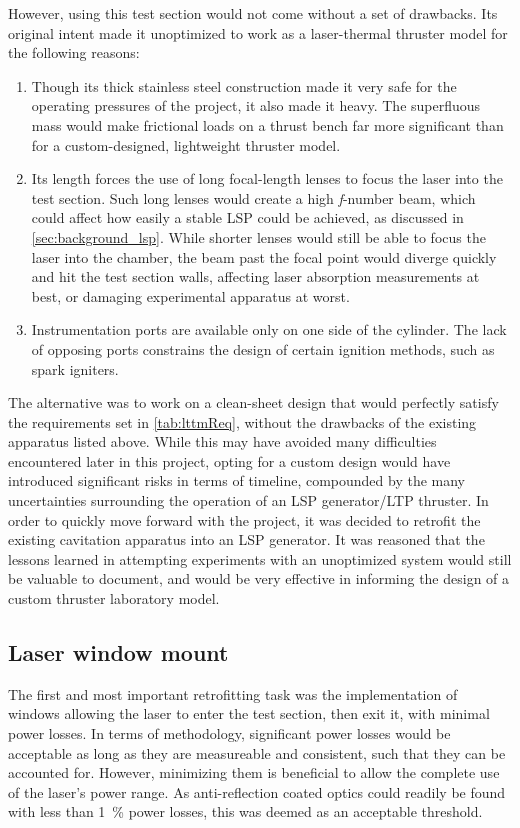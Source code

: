             However, using this test section would not come without a set of drawbacks. Its original intent made it unoptimized to work as a laser-thermal thruster model for the following reasons:
            \begin{enumerate}
                \item Though its thick stainless steel construction made it very safe for the operating pressures of the project, it also made it heavy. The superfluous mass would make frictional loads on a thrust bench far more significant than for a custom-designed, lightweight thruster model.
                \item Its length forces the use of long focal-length lenses to focus the laser into the test section. Such long lenses would create a high {\itshape f}-number beam, which could affect how easily a stable LSP could be achieved, as discussed in \autoref{sec:background_lsp}. While shorter lenses would still be able to focus the laser into the chamber, the beam past the focal point would diverge quickly and hit the test section walls, affecting laser absorption measurements at best, or damaging experimental apparatus at worst.
                \item Instrumentation ports are available only on one side of the cylinder. The lack of opposing ports constrains the design of certain ignition methods, such as spark igniters.
            \end{enumerate}

            The alternative was to work on a clean-sheet design that would perfectly satisfy the requirements set in \autoref{tab:lttmReq}, without the drawbacks of the existing apparatus listed above. While this may have avoided many difficulties encountered later in this project, opting for a custom design would have introduced significant risks in terms of timeline, compounded by the many uncertainties surrounding the operation of an LSP generator/LTP thruster. In order to quickly move forward with the project, it was decided to retrofit the existing cavitation apparatus into an LSP generator. It was reasoned that the lessons learned in attempting experiments with an unoptimized system would still be valuable to document, and would be very effective in informing the design of a custom thruster laboratory model.

        \subsection{Laser window mount} \label{sec:design_lwm}
            The first and most important retrofitting task was the implementation of windows allowing the laser to enter the test section, then exit it, with minimal power losses. In terms of methodology, significant power losses would be acceptable as long as they are measureable and consistent, such that they can be accounted for. However, minimizing them is beneficial to allow the complete use of the laser's power range. As anti-reflection coated optics could readily be found with less than 1~\% power losses, this was deemed as an acceptable threshold.

